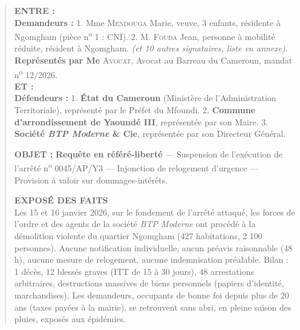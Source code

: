 \documentclass[11pt]{article}
\begin{document}
\begin{exoresolu}
\begin{quote}
\textbf{ENTRE :}\\
\textbf{Demandeurs :} 1. Mme \textsc{Mendouga} Marie, veuve, 3 enfants, résidente à Ngomgham (pièce n\textsuperscript{o} 1 : CNI). 2. M. \textsc{Fouda} Jean, personne à mobilité réduite, résident à Ngomgham. \emph{(et 10 autres signataires, liste en annexe)}.\\
\textbf{Représentés par Me} \textsc{Avocat}, Avocat au Barreau du Cameroun, mandat n\textsuperscript{o} 12/2026.\\\vspace{0.2cm}
\textbf{ET :}\\
\textbf{Défendeurs :} 1. \textbf{État du Cameroun} (Ministère de l'Administration Territoriale), représenté par le Préfet du Mfoundi. 2. \textbf{Commune d'arrondissement de Yaoundé III}, représentée par son Maire. 3. \textbf{Société \emph{BTP Moderne} \& Cie}, représentée par son Directeur Général.\\\vspace{0.3cm}

\textbf{OBJET :} \textbf{Requête en référé-liberté} — Suspension de l'exécution de l'arrêté n\textsuperscript{o} 0045/AP/Y3 — Injonction de relogement d'urgence — Provision à valoir sur dommages-intérêts.\\\vspace{0.3cm}

\textbf{EXPOSÉ DES FAITS}\\
Les 15 et 16 janvier 2026, sur le fondement de l'arrêté attaqué, les forces de l'ordre et des agents de la société \emph{BTP Moderne} ont procédé à la démolition violente du quartier Ngomgham (427 habitations, 2 100 personnes). Aucune notification individuelle, aucun préavis raisonnable (48 h), aucune mesure de relogement, aucune indemnisation préalable. Bilan : 1 décès, 12 blessés graves (ITT de 15 à 30 jours), 48 arrestations arbitraires, destructions massives de biens personnels (papiers d'identité, marchandises). Les demandeurs, occupants de bonne foi depuis plus de 20 ans (taxes payées à la mairie), se retrouvent sans abri, en pleine saison des pluies, exposés aux épidémies.\\\vspace{0.3cm}


\end{quote}
\end{exoresolu}
\end{document}
